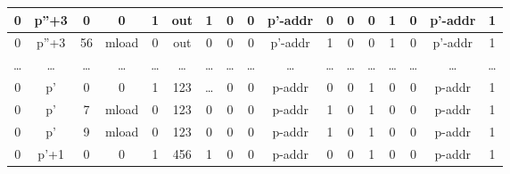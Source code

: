 \begin{table}[!ht]
\begin{adjustwidth}{-1.75cm}{}
\begin{tabular}{|c|c|c|c|c|c|c|c|c|c|c|c|c|c|c|c|c|}
            \hline
            \rowcolor{yellow!20} 0     & p''+3  & 0     & 0      & 1         & out   & \cellcolor{lightgray} 1        & \cellcolor{lightgray} 0     & \cellcolor{lightgray} 0     & p'-addr                 & \cellcolor{violet!30} 0     & 0     & \cellcolor{pink} 0     & \cellcolor{pink} 1     & \cellcolor{pink} 0     & p'-addr  & 1     \\
            \hline
            \rowcolor{yellow!20} 0     & p''+3  & 56    & mload  & 0         & out   & \cellcolor{lightgray} 0        & \cellcolor{lightgray} 0     & \cellcolor{lightgray} 0     & p'-addr                 & \cellcolor{violet!30} 1     & 0     & \cellcolor{pink} 0     & \cellcolor{pink} 1     & \cellcolor{pink} 0     & p'-addr  & 1     \\
            \hline
            \rowcolor{yellow!20} \dots & \dots  & \dots & \dots  & \dots     & \dots & \cellcolor{lightgray} \dots    & \cellcolor{lightgray} \dots & \cellcolor{lightgray} \dots & \dots                   & \cellcolor{violet!30} \dots & \dots & \cellcolor{pink} \dots & \cellcolor{pink} \dots & \cellcolor{pink} \dots & \dots    & \dots \\
            \hline
            \rowcolor{yellow!20} 0     & p'     & 0     & 0      & 1         & 123   & \cellcolor{lightgray} \dots    & \cellcolor{lightgray} 0     & \cellcolor{lightgray} 0     & p-addr                  & \cellcolor{violet!30} 0     & 0     & \cellcolor{pink} 1     & \cellcolor{pink} 0     & \cellcolor{pink} 0     & p-addr   & 1     \\
            \hline
            \rowcolor{yellow!20} 0     & p'     & 7     & mload  & 0         & 123   & \cellcolor{lightgray} 0        & \cellcolor{lightgray} 0     & \cellcolor{lightgray} 0     & p-addr                  & \cellcolor{violet!30} 1     & 0     & \cellcolor{pink} 1     & \cellcolor{pink} 0     & \cellcolor{pink} 0     & p-addr   & 1     \\
            \hline
            \rowcolor{yellow!20} 0     & p'     & 9     & mload  & 0         & 123   & \cellcolor{lightgray} 0        & \cellcolor{lightgray} 0     & \cellcolor{lightgray} 0     & p-addr                  & \cellcolor{violet!30} 1     & 0     & \cellcolor{pink} 1     & \cellcolor{pink} 0     & \cellcolor{pink} 0     & p-addr   & 1     \\
            \hline
            \rowcolor{yellow!20} 0     & p'+1   & 0     & 0      & 1         & 456   & \cellcolor{lightgray} 1        & \cellcolor{lightgray} 0     & \cellcolor{lightgray} 0     & p-addr                  & \cellcolor{violet!30} 0     & 0     & \cellcolor{pink} 1     & \cellcolor{pink} 0     & \cellcolor{pink} 0     & p-addr   & 1     \\

\end{tabular}
\end{adjustwidth}
\end{table}

